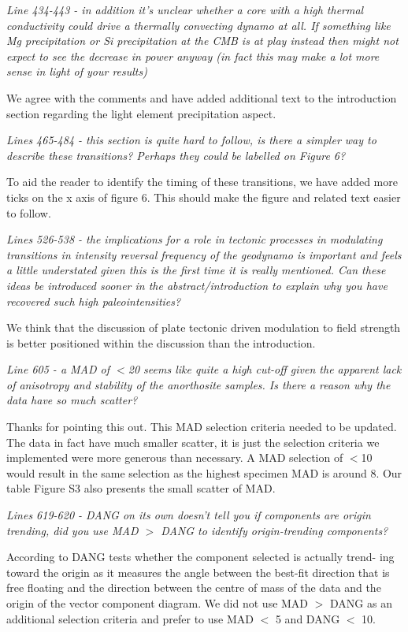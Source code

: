 \documentclass[11pt, letterpaper]{article}
\begin{document}
\begin{flushleft}
\textit{Line 434-443 - in addition it's unclear whether a core with a high thermal conductivity could drive a thermally convecting dynamo at all. If something like Mg precipitation or Si precipitation at the CMB is at play instead then might not expect to see the decrease in power anyway (in fact this may make a lot more sense in light of your results)}

We agree with the comments and have added additional text to the introduction section regarding the light element precipitation aspect. 

\textit{Lines 465-484 - this section is quite hard to follow, is there a simpler way to describe these transitions? Perhaps they could be labelled on Figure 6?}

To aid the reader to identify the timing of these transitions, we have added more ticks on the x axis of figure 6. This should make the figure and related text easier to follow.  

\textit{Lines 526-538 - the implications for a role in tectonic processes in modulating transitions in intensity\/ reversal frequency of the geodynamo is important and feels a little understated given this is the first time it is really mentioned. Can these ideas be introduced sooner in the abstract/introduction to explain why you have recovered such high paleointensities?}

We think that the discussion of plate tectonic driven modulation to field strength is better positioned within the discussion than the introduction. 

\textit{Line 605 - a MAD of $<$20 seems like quite a high cut-off given the apparent lack of anisotropy and stability of the anorthosite samples. Is there a reason why the data have so much scatter?}

Thanks for pointing this out. This MAD selection criteria needed to be updated. The data in fact have much smaller scatter, it is just the selection criteria we implemented were more generous than necessary. A MAD selection of $<$10 would result in the same selection as the highest specimen MAD is around 8. Our table Figure S3 also presents the small scatter of MAD. 

\textit{Lines 619-620 - DANG on its own doesn't tell you if components are origin trending, did you use MAD $>$ DANG to identify origin-trending components?}

According to \cite{Tauxe2004a} DANG tests whether the component selected is actually trend- ing toward the origin as it measures the angle between the best-fit direction that is free floating and the direction between the centre of mass of the data and the origin of the vector component diagram. We did not use MAD $>$ DANG as an additional selection criteria and prefer to use MAD $<$ 5 and DANG $<$ 10. 


\end{flushleft}
\end{document}
